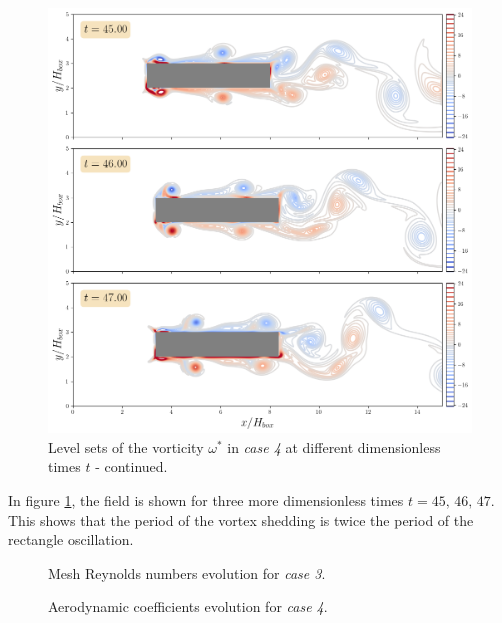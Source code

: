 \documentclass[11 pt]{article}
\begin{document}
\begin{figure}[H]
    \centering
    \includegraphics[width=\textwidth]{../figures/vorticity_case_4_part2.png}
    \caption{Level sets of the vorticity $\omega^*$ in \textit{case 4} at different dimensionless times $t$ - continued.}
    \label{fig:vorticity_4b}
\end{figure}

In figure \ref{fig:vorticity_4b}, the field is shown for three more dimensionless times $t=45,\, 46,\, 47$. This shows that the period of the vortex shedding is twice the period of the rectangle oscillation.

\begin{figure}[H]
    \centering
    
    \caption{Mesh Reynolds numbers evolution for \textit{case 3}.}
    \label{fig:mesh_re_case4}
\end{figure}

\begin{figure}[H]
    \centering
    
    \caption{Aerodynamic coefficients evolution for \textit{case 4}.}
    \label{fig:drag_case4}
\end{figure}

%     
\end{document}
